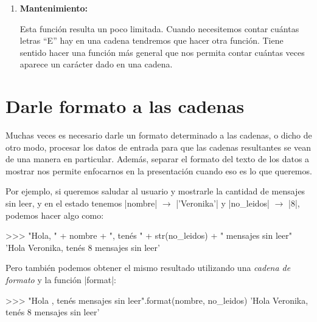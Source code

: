 \begin{enumerate}
\item {\bf Mantenimiento:}

Esta función resulta un poco limitada. Cuando necesitemos contar
cuántas letras ``E'' hay en una cadena tendremos que hacer otra función.
Tiene sentido hacer una función más general que nos permita contar cuántas
veces aparece un carácter dado en una cadena.




\end{enumerate}

\section{Darle formato a las cadenas}

Muchas veces es necesario darle un formato determinado a las cadenas, o dicho de
otro modo, procesar los datos de entrada para que las cadenas resultantes se
vean de una manera en particular. Además, separar el formato del texto de los
datos a mostrar nos permite enfocarnos en la presentación cuando eso es lo que
queremos.

Por ejemplo, si queremos saludar al usuario y mostrarle la
cantidad de mensajes sin leer, y en el estado tenemos |nombre| $\rightarrow$ |'Veronika'| y
|no_leidos| $\rightarrow$ |8|, podemos hacer algo como:

\begin{codigo-python-sn}
>>> "Hola, " + nombre + ", tenés " + str(no_leidos) + " mensajes sin leer"
'Hola Veronika, tenés 8 mensajes sin leer'
\end{codigo-python-sn}

Pero también podemos obtener el mismo resultado utilizando una \emph{cadena de
formato} y la función |format|:

\begin{codigo-python-sn}
>>> "Hola {}, tenés {} mensajes sin leer".format(nombre, no_leidos)
'Hola Veronika, tenés 8 mensajes sin leer'
\end{codigo-python-sn}

